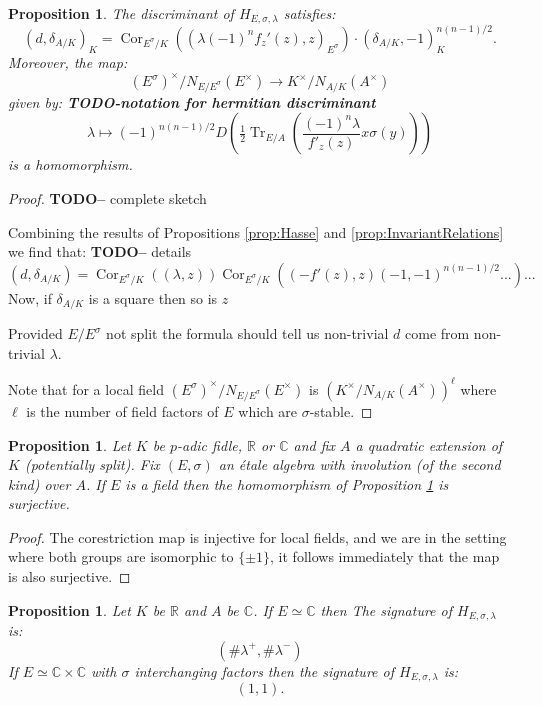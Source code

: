 \documentclass{article}
\theoremstyle{plain}
\newtheorem{proposition}[theorem]{Proposition}
\theoremstyle{definition}
\numberwithin{equation}{section}
\DeclareMathOperator{\Tr}{Tr}
\DeclareMathOperator{\Cor}{Cor}
\newcommand{\RR}{\mathbb{R}}
\newcommand{\CC}{\mathbb{C}}
\newcommand{\TODO}[1]{\textbf{TODO-#1}}
\begin{document}
\begin{proposition}\label{prop:discrimmap}
The discriminant of $H_{E,\sigma,\lambda}$ satisfies:
\[  (d,\delta_{A/K})_K =  \Cor_{E^\sigma/K}((\lambda (-1)^n f_z'(z), z)_{E^\sigma}) \cdot (\delta_{A/K},-1)_K^{n(n-1)/2}. \]
Moreover, the map:
\[ (E^\sigma)^\times/N_{E/E^\sigma}(E^\times) \rightarrow K^\times/N_{A/K}(A^\times) \]
given by:
\TODO{notation for hermitian discriminant}
\[ \lambda \mapsto (-1)^{n(n-1)/2} D\left( \tfrac{1}{2}\Tr_{E/A}\left( \frac{(-1)^n\lambda}{f'_z(z)} x\sigma(y) \right)\right) \]
is a homomorphism.
\end{proposition}
\begin{proof}
\TODO - complete sketch

Combining the results of Propositions \ref{prop:Hasse} and \ref{prop:InvariantRelations} we find that:
\TODO - details
\[ (d,\delta_{A/K}) =  \Cor_{E^\sigma/K}((\lambda,z)) \Cor_{E^\sigma/K}((-f'(z),z) (-1,-1)^{n(n-1)/2}...) ... \]
Now, if $\delta_{A/K}$ is a square then so is $z$

Provided $E/E^\sigma$ not split the formula should tell us non-trivial $d$ come from non-trivial $\lambda$.

Note that for a local field $(E^\sigma)^\times/N_{E/E^\sigma}(E^\times)$ is $( K^\times/N_{A/K}(A^\times))^\ell$ where $\ell$ is the number of field factors of $E$ which are $\sigma$-stable.
\end{proof}

\begin{proposition}\label{prop:discrimmapsurjective}
Let $K$ be $p$-adic fidle, $\RR$ or $\CC$ and fix $A$ a quadratic extension of $K$ (potentially split).
Fix $(E,\sigma)$ an \'etale algebra with involution (of the second kind) over $A$.
If $E$ is a field then the homomorphism of Proposition \ref{prop:discrimmap} is surjective.
\end{proposition}
\begin{proof}
The corestriction map is injective for local fields, and we are in the setting where both groups are isomorphic to $\{\pm1\}$, it follows immediately that the map is also surjective.
\end{proof}

\begin{proposition}\label{prop:signature}
Let $K$ be $\RR$ and $A$ be $\CC$.
If $E \simeq \CC$ then
The signature of $H_{E,\sigma,\lambda}$ is:
\[ (\#\lambda^+,\#\lambda^-) \]
If $E\simeq \CC\times\CC$ with $\sigma$ interchanging factors then the signature of $H_{E,\sigma,\lambda}$ is:
\[ (1,1). \]
\end{proposition}
\end{document}
